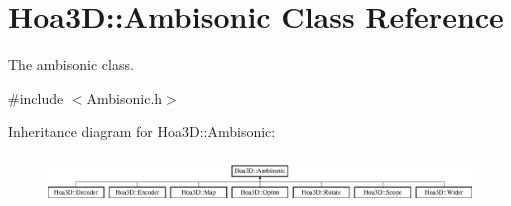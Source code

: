 \hypertarget{class_hoa3_d_1_1_ambisonic}{\section{Hoa3\-D\-:\-:Ambisonic Class Reference}
\label{class_hoa3_d_1_1_ambisonic}
}


The ambisonic class.  




{\ttfamily \#include $<$Ambisonic.\-h$>$}

Inheritance diagram for Hoa3\-D\-:\-:Ambisonic\-:\begin{figure}[H]
\begin{center}
\leavevmode
\includegraphics[height=1.300813cm]{class_hoa3_d_1_1_ambisonic}
\end{center}
\end{figure}
